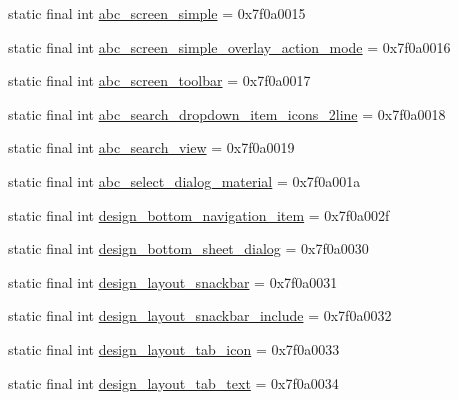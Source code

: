 \begin{DoxyCompactItemize}
\item 
static final int \mbox{\hyperlink{classandroid_1_1support_1_1design_1_1R_1_1layout_a957aec20303a776f195a00390496753b}{abc\+\_\+screen\+\_\+simple}} = 0x7f0a0015
\item 
static final int \mbox{\hyperlink{classandroid_1_1support_1_1design_1_1R_1_1layout_a3098585a2f723080061fd42dd4d91d94}{abc\+\_\+screen\+\_\+simple\+\_\+overlay\+\_\+action\+\_\+mode}} = 0x7f0a0016
\item 
static final int \mbox{\hyperlink{classandroid_1_1support_1_1design_1_1R_1_1layout_a27b17cd1e50e5101addd868ef7348ead}{abc\+\_\+screen\+\_\+toolbar}} = 0x7f0a0017
\item 
static final int \mbox{\hyperlink{classandroid_1_1support_1_1design_1_1R_1_1layout_ac425206367179409e7f02a364f820c2f}{abc\+\_\+search\+\_\+dropdown\+\_\+item\+\_\+icons\+\_\+2line}} = 0x7f0a0018
\item 
static final int \mbox{\hyperlink{classandroid_1_1support_1_1design_1_1R_1_1layout_aaddf023060f3d2bcf6aeaa8a47cba6da}{abc\+\_\+search\+\_\+view}} = 0x7f0a0019
\item 
static final int \mbox{\hyperlink{classandroid_1_1support_1_1design_1_1R_1_1layout_a4138a3a5dbeee0c457208d182140fff7}{abc\+\_\+select\+\_\+dialog\+\_\+material}} = 0x7f0a001a
\item 
static final int \mbox{\hyperlink{classandroid_1_1support_1_1design_1_1R_1_1layout_a92dd59bbbfd48a7d7ef64c8e52a1e34e}{design\+\_\+bottom\+\_\+navigation\+\_\+item}} = 0x7f0a002f
\item 
static final int \mbox{\hyperlink{classandroid_1_1support_1_1design_1_1R_1_1layout_ab3671735991f403412ea91ffc3af61c1}{design\+\_\+bottom\+\_\+sheet\+\_\+dialog}} = 0x7f0a0030
\item 
static final int \mbox{\hyperlink{classandroid_1_1support_1_1design_1_1R_1_1layout_a8d7f864b1731af8b70ca0654071ad76e}{design\+\_\+layout\+\_\+snackbar}} = 0x7f0a0031
\item 
static final int \mbox{\hyperlink{classandroid_1_1support_1_1design_1_1R_1_1layout_a98d09e99d5eb781fb883b7b11df24dd6}{design\+\_\+layout\+\_\+snackbar\+\_\+include}} = 0x7f0a0032
\item 
static final int \mbox{\hyperlink{classandroid_1_1support_1_1design_1_1R_1_1layout_a736d88071f77d19d86aa429d88c05d80}{design\+\_\+layout\+\_\+tab\+\_\+icon}} = 0x7f0a0033
\item 
static final int \mbox{\hyperlink{classandroid_1_1support_1_1design_1_1R_1_1layout_a25a0ff3a8a0971cf70afd38cceec34ee}{design\+\_\+layout\+\_\+tab\+\_\+text}} = 0x7f0a0034

\end{DoxyCompactItemize}
